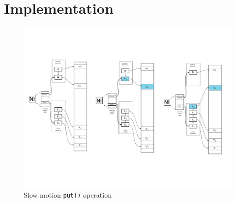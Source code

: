 \section{Implementation}

\begin{figure}[h]
  \centering
  \includegraphics[width=\linewidth]{figs/put}
  \caption{Slow motion {\tt put()} operation}
  \label{fig:put}
\end{figure}
